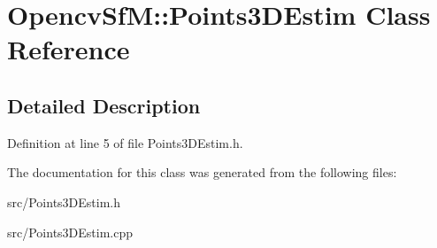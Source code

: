 \hypertarget{class_opencv_sf_m_1_1_points3_d_estim}{
\section{OpencvSfM::Points3DEstim Class Reference}
\label{class_opencv_sf_m_1_1_points3_d_estim}
}


\subsection{Detailed Description}


Definition at line 5 of file Points3DEstim.h.



The documentation for this class was generated from the following files:\begin{DoxyCompactItemize}
\item 
src/Points3DEstim.h\item 
src/Points3DEstim.cpp\end{DoxyCompactItemize}
